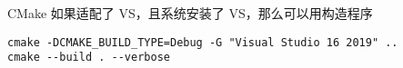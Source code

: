 
CMake 如果适配了 VS，且系统安装了 VS，那么可以用构造程序
\begin{lstlisting}[language=none]
cmake -DCMAKE_BUILD_TYPE=Debug -G "Visual Studio 16 2019" ..
cmake --build . --verbose
\end{lstlisting}

